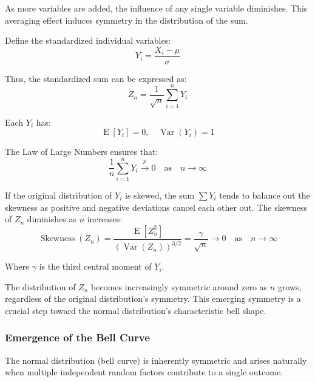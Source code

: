 \documentclass[11pt, headings=standardclasses, parskip=half, twoside]{scrartcl}
\begin{document}
As more variables are added, the influence of any single variable diminishes. This averaging effect induces symmetry in the distribution of the sum.

Define the standardized individual variables:
\[
Y_{i}=\frac{X_{i}-\mu}{\sigma}
\]

Thus, the standardized sum can be expressed as:
\[
Z_{n}=\frac{1}{\sqrt{n}} \sum_{i=1}^{n} Y_{i}
\]

Each $Y_{i}$ has:
\[
\operatorname{E}[Y_{i}]=0, \quad \operatorname{Var}(Y_{i})=1
\]

The Law of Large Numbers ensures that:
\[
\frac{1}{n} \sum_{i=1}^{n} Y_{i} \xrightarrow{p} 0 \quad \text{as} \quad n \to \infty
\]

 If the original distribution of $Y_{i}$ is skewed, the sum $\sum Y_{i}$ tends to balance out the skewness as positive and negative deviations cancel each other out. The skewness of $Z_{n}$ diminishes as $n$ increases:
\[
\operatorname{Skewness}(Z_{n})=\frac{\operatorname{E}[Z_{n}^{3}]}{(\operatorname{Var}(Z_{n}))^{3 / 2}}=\frac{\gamma}{\sqrt{n}} \to 0 \quad \text{as} \quad n \to \infty
\]

Where $\gamma$ is the third central moment of $Y_{i}$.

The distribution of $Z_{n}$ becomes increasingly symmetric around zero as $n$ grows, regardless of the original distribution's symmetry. This emerging symmetry is a crucial step toward the normal distribution's characteristic bell shape.

\subsubsection{Emergence of the Bell Curve}
The normal distribution (bell curve) is inherently symmetric and arises naturally when multiple independent random factors contribute to a single outcome.
\end{document}
